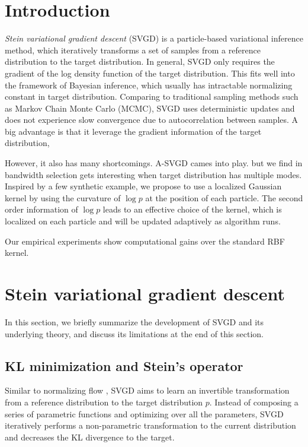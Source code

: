\section{Introduction} \label{sec:intro}
\emph{Stein variational gradient descent} (SVGD) \citep{liu2016stein} is a particle-based variational inference method, which iteratively transforms a set of samples from a reference distribution to the target distribution. In general, SVGD only requires the gradient of the log density function of the target distribution. This fits well into the framework of Bayesian inference, which usually has intractable normalizing constant in target distribution.   Comparing to traditional sampling methods such as Markov Chain Monte Carlo (MCMC), SVGD uses deterministic updates and does not experience slow convergence due to autocorrelation between samples. A big advantage is that it leverage the gradient information of the target distribution, 

However, it also has many shortcomings. A-SVGD cames into play. but we find in  bandwidth selection gets interesting when target distribution has multiple modes. Inspired by a few synthetic example, we propose to use a localized Gaussian kernel by using the curvature of $\log p$ at the position of each particle. 
The second order information of $\log p$ leads to an effective choice of the kernel, which is localized on each particle and will be updated adaptively as algorithm runs. 

Our empirical experiments show computational gains over the standard RBF kernel.





\section{Stein variational gradient descent} \label{sec:summary}
In this section, we briefly summarize the development of SVGD  and its underlying theory, and discuss its limitations at the end of this section.



\subsection{KL minimization and Stein's operator}

Similar to normalizing flow \citep{kobyzev2020normalizing}, SVGD aims to learn an invertible transformation from a reference distribution to the target distribution $p$.
Instead of composing a series of parametric functions and optimizing over all the parameters, SVGD iteratively performs a non-parametric transformation to the current distribution and decreases the KL divergence to the target.

